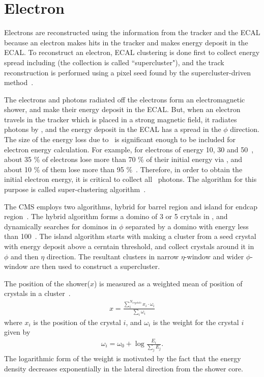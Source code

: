 \section{ Electron }
\label{sec:electron_reco}

Electrons are reconstructed using the information from the tracker and the ECAL 
because an electron makes hits in the tracker and makes energy deposit in the ECAL.
To reconstruct an electron, ECAL clustering is done first to collect energy 
spread including \brem(the collection is called ``supercluster"), 
and the track reconstruction is performed using a pixel seed found 
by the supercluster-driven method~\cite{Baffioni:2006cd}.  
 
The electrons and photons radiated off the electrons 
form an electromagnetic shower, and make their energy deposit in the ECAL. 
But, when an electron travels in the tracker which is placed in a strong magnetic field, 
it radiates photons by \brem, and the energy deposit 
in the ECAL has a spread in the $\phi$ direction. The size of the energy loss due to \brem\ 
is significant enough to be included for electron energy calculation. 
For example, for electrons of energy 10, 30 and 50~\GeV, about 35 \% of electrons 
lose more than 70 \% of their initial energy via \brem, and about 10 \% of them 
lose more than 95 \%~\cite{Baffioni:2006cd}. Therefore, in order to 
obtain the initial electron energy, it is critical to collect all \brem\ photons.
The algorithm for this purpose is called super-clustering algorithm~\cite{Baffioni:2006cd}.

The CMS employs two algorithms, hybrid for barrel region 
and island for endcap region~\cite{Baffioni:2006cd}. 
The hybrid algorithm forms a domino of 3 or 5 crytals in \Eta, and
dynamically searches for dominos in $\phi$ separated by a domino with energy less 
than 100~\MeV.
The island algorithm starts with making a cluster from a seed crystal with energy deposit 
above a cerntain threshold, and collect crystals around it 
in $\phi$ and then $\eta$ direction. 
The resultant clusters in narrow $\eta$-window and wider $\phi$-window 
are then used to construct a supercluster.

The position of the shower($x$) is measured as a weighted mean of position of crystals 
in a cluster~\cite{cmstdr1}. 
\begin{eqnarray} 
x = \frac{\displaystyle \sum_i^{N_{crystals}} {x_i} \cdot \omega_i}
         {\displaystyle \sum_i \omega_i}   
\end{eqnarray}
where $x_i$ is the position of the crystal $i$, 
and $\omega_i$ is the weight for the crystal $i$ given by  
\begin{eqnarray} 
\omega_i = \omega_0 + \log{\frac{E_i}{\displaystyle \sum_j E_j}}.
\end{eqnarray} 
The logarithmic form of the weight is motivated by the fact that 
the energy density decreases exponentially in the lateral direction 
from the shower core.  


